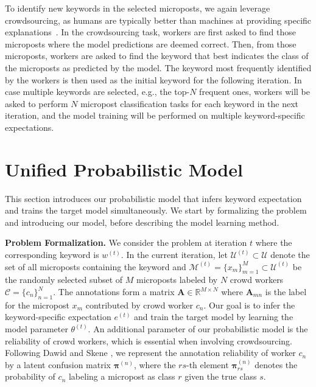 \documentclass[letterpaper]{article}
\begin{document}
To identify new keywords in the selected microposts, we again leverage crowdsourcing, as humans are typically better than machines at providing specific explanations~\cite{mcdonnell2016relevant,chang2016crowd}. In the crowdsourcing task, workers are first asked to find those microposts where the model predictions are deemed correct. Then, from those microposts, workers are asked to find the keyword that best indicates the class of the microposts as predicted by the model. The keyword most frequently identified by the workers is then used as the initial keyword for the following iteration. In case multiple keywords are selected, e.g., the top-$N$ frequent ones, workers will be asked to perform $N$ micropost classification tasks for each keyword in the next iteration, and the model training will be performed on multiple keyword-specific expectations.
 
\section{Unified Probabilistic Model}
\label{UPmodel}

This section introduces our probabilistic model that infers keyword expectation and trains the target model simultaneously. We start by formalizing the problem and introducing our model, before describing the model learning method.

\smallskip
\noindent \textbf{Problem Formalization.} We consider the problem at iteration $t$ where the corresponding keyword is $w^{(t)}$. In the current iteration, let $\mathcal{U}^{(t)} \subset \mathcal{U}$ denote the set of all microposts containing the keyword and $\mathcal{M}^{(t)}= \{x_{m}\}_{m=1}^M\subset \mathcal{U}^{(t)}$ be the randomly selected subset of $M$ microposts labeled by $N$ crowd workers $\mathcal{C} = \{c_n\}_{n=1}^N$. The annotations form a matrix $\mathbf{A}\in \mathbb{R}^{M\times N}$ where $\mathbf{A}_{mn}$ is the label for the micropost $x_m$ contributed by crowd worker $c_n$. Our goal is to infer the keyword-specific expectation $e^{(t)}$ and train the target model by learning the model parameter $\theta^{(t)}$. An additional parameter of our probabilistic model is the reliability of crowd workers, which is essential when involving crowdsourcing. Following Dawid and Skene  \cite{dawid1979maximum,zheng2017truth}, we represent the annotation reliability of worker $c_n$ by a latent confusion matrix $\boldsymbol{\pi}^{(n)}$, where the $rs$-th element $\boldsymbol{\pi}_{rs}^{(n)}$ denotes the probability of $c_n$ labeling a micropost as class $r$ given the true class $s$. 
\end{document}
